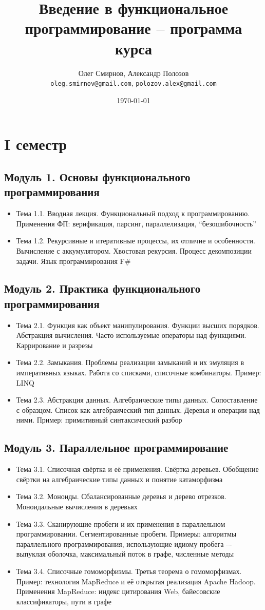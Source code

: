 \documentclass[a4paper,11pt]{article}
\author{Олег Смирнов, Александр Полозов \\
\texttt{oleg.smirnov@gmail.com}, \texttt{polozov.alex@gmail.com}}
\date{\today}
\title{Введение в функциональное программирование -- программа курса}
\begin{document}
\maketitle
\section*{I семестр}
\subsection*{Модуль 1. Основы функционального программирования}
\begin{itemize}
\item Тема 1.1. Вводная лекция. Функциональный подход к программированию.
Применения ФП: верификация, парсинг, параллелизация, ``безошибочность''
\item Тема 1.2. Рекурсивные и итеративные процессы, их отличие и особенности.
Вычисление с аккумулятором. Хвостовая рекурсия. Процесс декомпозиции задачи.
Язык программирования F\#
\end{itemize}
\subsection*{Модуль 2. Практика функционального программирования}
\begin{itemize}
\item Тема 2.1. Функция как объект манипулирования. Функции высших порядков.
Абстракция вычисления. Часто используемые операторы над функциями. 
Каррирование и разрезы
\item Тема 2.2. Замыкания. Проблемы реализации замыканий и их эмуляция в 
императивных языках. Работа со списками, списочные комбинаторы. Пример: LINQ
\item Тема 2.3. Абстракция данных. Алгебраические типы данных. Сопоставление с
образцом. Список как алгебраический тип данных. Деревья и операции над ними.
Пример: примитивный синтаксический разбор
\end{itemize}
\subsection*{Модуль 3. Параллельное программирование}
\begin{itemize}
\item Тема 3.1. Списочная свёртка и её применения. Свёртка деревьев. Обобщение
свёртки на алгебраические типы данных и понятие катаморфизма
\item Тема 3.2. Моноиды. Сбалансированные деревья и дерево отрезков.
Моноидальные вычисления в деревьях
\item Тема 3.3. Сканирующие пробеги и их применения в параллельном
программировании. Сегментированные пробеги. Примеры: алгоритмы параллельного
программирования, использующие идиому пробега –- выпуклая оболочка, максимальный
поток в графе, численные методы
\item Тема 3.4. Списочные гомоморфизмы. Третья теорема о гомоморфизмах. Пример:
технология MapReduce и её открытая реализация Apache Hadoop. Применения
MapReduce: индекс цитирования Web, байесовские классификаторы, пути в графе
\end{itemize}
\end{document}
